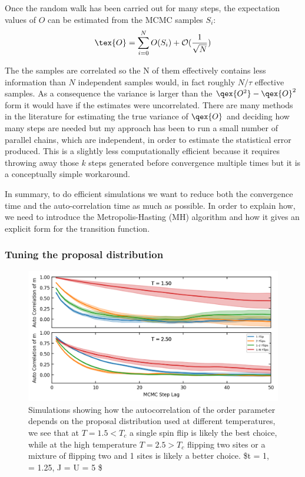 Once the random walk has been carried out for many steps, the expectation values of \(O\) can be estimated from the MCMC samples \(S_i\): \[
    \tex{O} = \sum_{i = 0}^{N} O(S_i) + \mathcal{O}(\frac{1}{\sqrt{N}})
\]

The the samples are correlated so the N of them effectively contains less information than \(N\) independent samples would, in fact roughly \(N/\tau\) effective samples. As a consequence the variance is larger than the \(\qex{O^2} - \qex{O}^2\) form it would have if the estimates were uncorrelated. There are many methods in the literature for estimating the true variance of \(\qex{O}\) and deciding how many steps are needed but my approach has been to run a small number of parallel chains, which are independent, in order to estimate the statistical error produced. This is a slightly less computationally efficient because it requires throwing away those \(k\) steps generated before convergence multiple times but it is a conceptually simple workaround.

In summary, to do efficient simulations we want to reduce both the convergence time and the auto-correlation time as much as possible. In order to explain how, we need to introduce the Metropolis-Hasting (MH) algorithm and how it gives an explicit form for the transition function.

\hypertarget{tuning-the-proposal-distribution}{%
\subsubsection{Tuning the proposal distribution}\label{tuning-the-proposal-distribution}}

\hypertarget{fig:autocorr_multiple_proposals}{%
\begin{figure}
\centering
\includegraphics[width=1\textwidth,height=\textheight]{../figure_code/fk_chapter/lsr/figs/autocorr_multiple_proposals.png}
\caption[{no title}]{Simulations showing how the autocorrelation of the order parameter depends on the proposal distribution used at different temperatures, we see that at \(T = 1.5 < T_c\) a single spin flip is likely the best choice, while at the high temperature \(T = 2.5 > T_c\) flipping two sites or a mixture of flipping two and 1 sites is likely a better choice. \$t = 1, \alpha = 1.25, J = U = 5 \$}
\label{fig:autocorr_multiple_proposals}
\end{figure}
}

